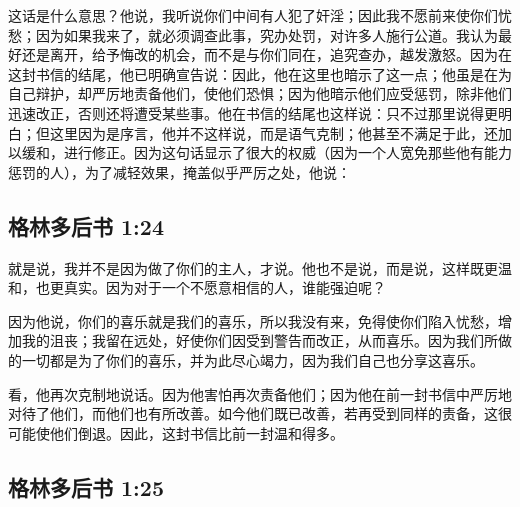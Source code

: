 这话是什么意思？他说，我听说你们中间有人犯了奸淫；因此我不愿前来使你们忧愁；因为如果我来了，就必须调查此事，究办处罚，对许多人施行公道。我认为最好还是离开，给予悔改的机会，而不是与你们同在，追究查办，越发激怒。因为在这封书信的结尾，他已明确宣告说：因此，他在这里也暗示了这一点；他虽是在为自己辩护，却严厉地责备他们，使他们恐惧；因为他暗示他们应受惩罚，除非他们迅速改正，否则还将遭受某些事。他在书信的结尾也这样说：只不过那里说得更明白；但这里因为是序言，他并不这样说，而是语气克制；他甚至不满足于此，还加以缓和，进行修正。因为这句话显示了很大的权威（因为一个人宽免那些他有能力惩罚的人），为了减轻效果，掩盖似乎严厉之处，他说：\par


\subsection{格林多后书 1:24}

\par

就是说，我并不是因为做了你们的主人，才说。他也不是说，而是说，这样既更温和，也更真实。因为对于一个不愿意相信的人，谁能强迫呢？\par

\par

因为他说，你们的喜乐就是我们的喜乐，所以我没有来，免得使你们陷入忧愁，增加我的沮丧；我留在远处，好使你们因受到警告而改正，从而喜乐。因为我们所做的一切都是为了你们的喜乐，并为此尽心竭力，因为我们自己也分享这喜乐。\par

看，他再次克制地说话。因为他害怕再次责备他们；因为他在前一封书信中严厉地对待了他们，而他们也有所改善。如今他们既已改善，若再受到同样的责备，这很可能使他们倒退。因此，这封书信比前一封温和得多。\par


\subsection{格林多后书 1:25}

